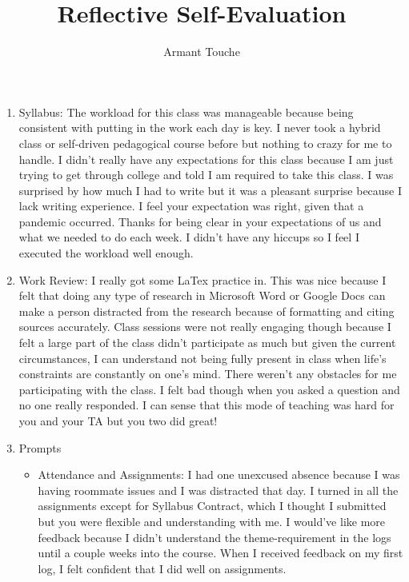 \documentclass{article}
\begin{document}
\title{\vspace{-2cm}Reflective Self-Evaluation}
\author{Armant Touche}
\maketitle

\begin{enumerate}

    \item Syllabus: The workload for this class was manageable because being consistent with putting in the work each day is key. I never took a hybrid class or self-driven pedagogical course before but nothing to crazy for me to handle. I didn't really have any expectations for this class because I am just trying to get through college and told I am required to take this class. I was surprised by how much I had to write but it was a pleasant surprise because I lack writing experience. I feel your expectation was right, given that a pandemic occurred. Thanks for being clear in your expectations of us and what we needed to do each week. I didn't have any hiccups so I feel I executed the workload well enough.

    \item Work Review: I really got some LaTex practice in. This was nice because I felt that doing any type of research in Microsoft Word or Google Docs can make a person distracted from the research because of formatting and citing sources accurately. Class sessions were not really engaging though because I felt a large part of the class didn't participate as much but given the current circumstances, I can understand not being fully present in class when life's constraints are constantly on one's mind. There weren't any obstacles for me participating with the class. I felt bad though when you asked a question and no one really responded. I can sense that this mode of teaching was hard for you and your TA but you two did great! 

    \item Prompts
    
    \begin{itemize}

        \item Attendance and Assignments: I had one unexcused absence because I was having roommate issues and I was distracted that day. I turned in all the assignments except for Syllabus Contract, which I thought I submitted but you were flexible and understanding with me. I would've like more feedback because I didn't understand the theme-requirement in the logs until a couple weeks into the course. When I received feedback on my first log, I felt confident that I did well on assignments.


\end{itemize}
\end{enumerate}
\end{document}

